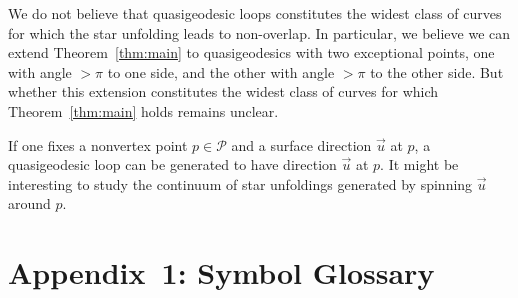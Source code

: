 \pdfoutput=1  \documentclass[]{article}
\newcommand{\thmref}[1]{\ref{thm:#1}}
\def\P{{\mathcal P}}
\begin{document}
We do not believe that quasigeodesic loops constitutes the widest class of
curves for which the star unfolding leads to non-overlap.
In particular, we believe we can extend
Theorem~\thmref{main} to
quasigeodesics with two exceptional points, one with angle ${>}\pi$
to one side, and the other with angle ${>}\pi$ to the other side.
But whether this extension constitutes the widest class of curves for which
Theorem~\thmref{main} holds remains unclear. 

If one fixes a nonvertex point $p \in \P$ and a surface direction $\overrightarrow{u}$ 
at $p$, a quasigeodesic loop 
can be generated to have direction $\overrightarrow{u}$ at $p$.
It might be interesting to study the continuum of star unfoldings 
generated by spinning $\overrightarrow{u}$ around $p$.


\section*{Appendix~1: Symbol Glossary}
\end{document}
